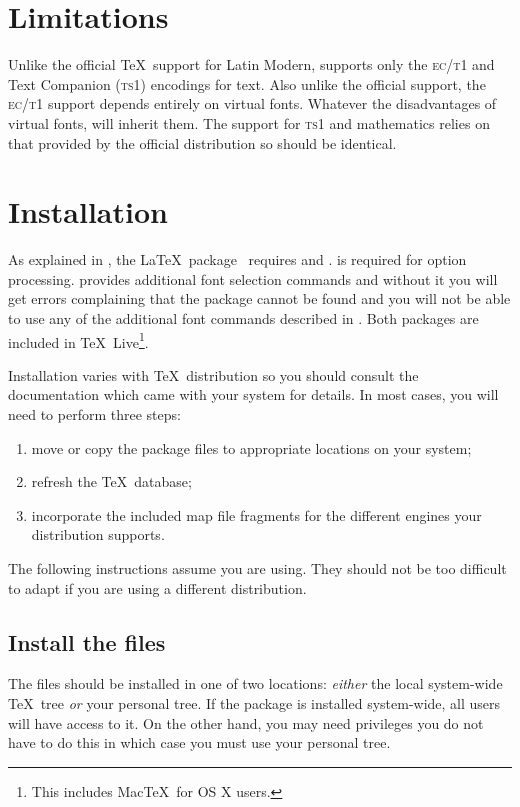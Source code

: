 \documentclass[11pt,british,a4paper]{article}
\begin{document}
\section{Limitations}

Unlike the official \TeX\ support for Latin Modern,  supports only the \textsc{ec}/\textsc{t1} and Text Companion (\textsc{ts1}) encodings for text. Also unlike the official support, the \textsc{ec}/\textsc{t1} support depends entirely on virtual fonts. Whatever the disadvantages of virtual fonts,  will inherit them. The support for \textsc{ts1} and mathematics relies on that provided by the official distribution so should be identical.

\section{Installation}

As explained in , the \LaTeX\ package \ requires  and .  is required for option processing.  provides additional font selection commands and without it you will get errors complaining that the package cannot be found and you will not be able to use any of the additional font commands described in . Both packages are included in \TeX~Live\footnote{This includes Mac\TeX\ for OS X users.}.

Installation varies with \TeX\ distribution so you should consult the documentation which came with your system for details. In most cases, you will need to perform three steps:
		\begin{enumerate}
			\item move or copy the package files to appropriate locations on your system;
			\item refresh the \TeX\ database;
			\item incorporate the included map file fragments for the different engines your distribution supports.
		\end{enumerate}

The following instructions assume you are using. They should not be too difficult to adapt if you are using a different distribution.

\subsection{Install the files}

The files should be installed in one of two locations: \emph{either} the local system-wide \TeX\ tree \emph{or} your personal tree. If the package is installed system-wide, all users will have access to it. On the other hand, you may need privileges you do not have to do this in which case you must use your personal tree.
\end{document}
